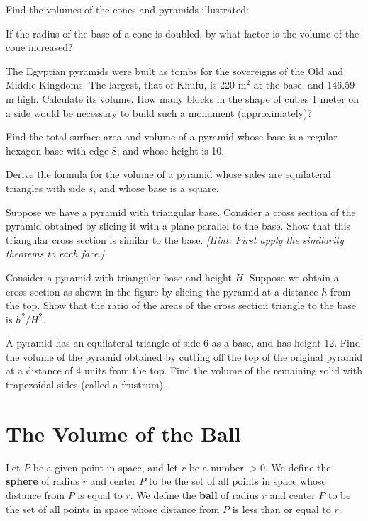 \documentclass[12pt]{book} %
\begin{document}
\setcounter{Exercise}{0}
\begin{ExerciseList}
\Exercise Find the volumes of the cones and pyramids illustrated:


\Exercise If the radius of the base of a cone is doubled, by what factor is the volume of the cone increased?

\Exercise The Egyptian pyramids were built as tombs for the sovereigns of the Old and Middle Kingdoms. The largest, that of Khufu, is 220 m$^2$ at the base, and 146.59 m high. Calculate its volume. How many blocks in the shape of cubes 1 meter on a side would be necessary to build such a monument (approximately)?

\Exercise Find the total surface area and volume of a pyramid whose base is a regular hexagon base with edge 8; and whose height is 10.

\Exercise Derive the formula for the volume of a pyramid whose sides are equilateral triangles with side $s$, and whose base is a square.

\Exercise Suppose we have a pyramid with triangular base. Consider a cross section of the pyramid obtained by slicing it with a plane parallel to the base. Show that this triangular cross section is similar to the base. \textit{[Hint: First apply the similarity theorems to each face.]}

\Exercise Consider a pyramid with triangular base and height $H$. Suppose we obtain a cross section as shown in the figure by slicing the pyramid at a distance $h$ from the top. Show that the ratio of the areas of the cross section triangle to the base is $h^2/H^2$.


\Exercise A pyramid has an equilateral triangle of side 6 as a base, and has height 12. Find the volume of the pyramid obtained by cutting off the top of the original pyramid at a distance of 4 units from the top. Find the volume of the remaining solid with trapezoidal sides (called a frustrum).
\end{ExerciseList}

\section{The Volume of the Ball}

Let $P$ be a given point in space, and let $r$ be a number $>0$. We define the \textbf{sphere} of radius $r$ and center $P$ to be the set of all points in space whose distance from $P$ is equal to $r$. We define the \textbf{ball} of radius $r$ and center $P$ to be the set of all points in space whose distance from $P$ is less than or equal to $r$.
\end{document}
